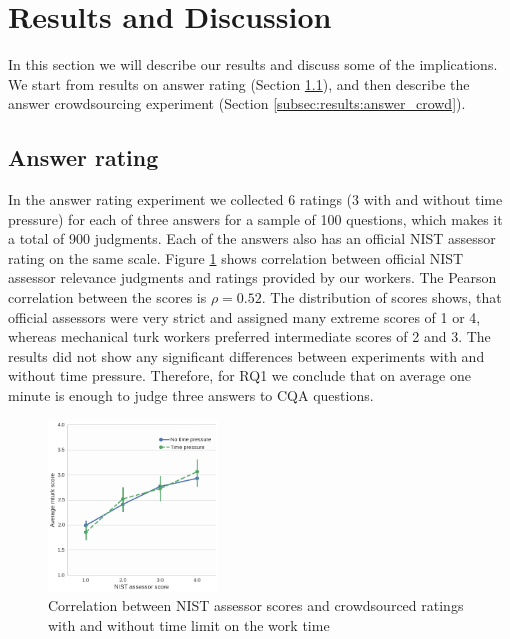 \documentclass[11pt,letterpaper]{article}
\begin{document}
\section{Results and Discussion}
\label{sec:results}

In this section we will describe our results and discuss some of the implications.
We start from results on answer rating (Section \ref{subsec:results:answer_rating}), and then describe the answer crowdsourcing experiment (Section \ref{subsec:results:answer_crowd}).

\subsection{Answer rating}
\label{subsec:results:answer_rating}

In the answer rating experiment we collected 6 ratings (3 with and without time pressure) for each of three answers for a sample of 100 questions, which makes it a total of 900 judgments.
Each of the answers also has an official NIST assessor rating on the same scale.
Figure \ref{figure:score_correlation} shows correlation between official NIST assessor relevance judgments and ratings provided by our workers.
The Pearson correlation between the scores is $\rho=0.52$.
The distribution of scores shows, that official assessors were very strict and assigned many extreme scores of 1 or 4, whereas mechanical turk workers preferred intermediate scores of 2 and 3.
The results did not show any significant differences between experiments with and without time pressure.
Therefore, for RQ1 we conclude that on average one minute is enough to judge three answers to CQA questions.


\begin{figure}[t!]
	\centering
	\includegraphics[width=0.4\textwidth]{img/score_correlation}
	\caption{Correlation between NIST assessor scores and crowdsourced ratings with and without time limit on the work time}
	\label{figure:score_correlation}
\end{figure}
	
\end{document}
